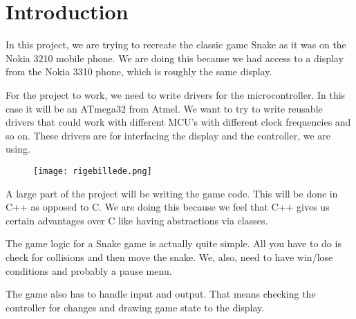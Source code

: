 \chapter*{Introduction}

In this project, we are trying to recreate the classic game Snake as it was on the Nokia 3210 mobile phone. We are doing this because we had access to a display from the Nokia 3310 phone, which is roughly the same display.

For the project to work, we need to write drivers for the microcontroller. In this case it will be an ATmega32 from Atmel. We want to try to write reusable drivers that could work with different MCU's with different clock frequencies and so on. These drivers are for interfacing the display and the controller, we are using. 

\begin{figure}
\centering
\texttt{[image: rigebillede.png]}
\end{figure}

A large part of the project will be writing the game code. This will be done in C++ as opposed to C. We are doing this because we feel that C++ gives us certain advantages over C like having abstractions via classes.

The game logic for a Snake game is actually quite simple. All you have to do is check for collisions and then move the snake. We, also, need to have win/lose conditions and probably a pause menu. 

The game also has to handle input and output. That means checking the controller for changes and drawing game state to the display.

